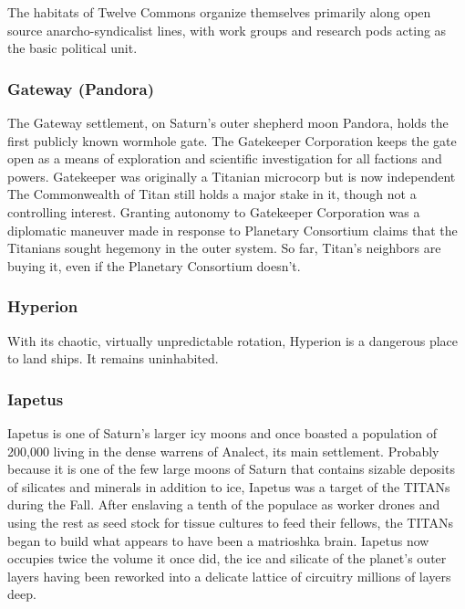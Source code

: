 The habitats of Twelve Commons organize
themselves primarily along open
source anarcho-syndicalist lines, with 
work groups and research pods acting as 
the basic political unit.

\subsubsection{Gateway (Pandora)}

The Gateway settlement, on Saturn's outer shepherd
moon Pandora, holds the first publicly known
wormhole gate. The Gatekeeper Corporation keeps 
the gate open as a means of exploration and scientific 
investigation for all factions and powers. Gatekeeper 
was originally a Titanian microcorp but is now independent
The Commonwealth of Titan still holds a
major stake in it, though not a controlling interest. 
Granting autonomy to Gatekeeper Corporation was 
a diplomatic maneuver made in response to Planetary 
Consortium claims that the Titanians sought hegemony
in the outer system. So far, Titan's neighbors are
buying it, even if the Planetary Consortium doesn't.

\subsubsection{Hyperion}

With its chaotic, virtually unpredictable rotation, 
Hyperion is a dangerous place to land ships. It remains
uninhabited.

\subsubsection{Iapetus}

Iapetus is one of Saturn's larger icy moons and once 
boasted a population of 200,000 living in the dense 
warrens of Analect, its main settlement. Probably because
it is one of the few large moons of Saturn that
contains sizable deposits of silicates and minerals in 
addition to ice, Iapetus was a target of the TITANs 
during the Fall. After enslaving a tenth of the populace
as worker drones and using the rest as seed stock
for tissue cultures to feed their fellows, the TITANs 
began to build what appears to have been a matrioshka
brain. Iapetus now occupies twice the volume
it once did, the ice and silicate of the planet's outer 
layers having been reworked into a delicate lattice of 
circuitry millions of layers deep.

